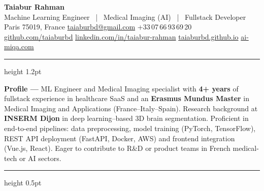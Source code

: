 \documentclass[10pt, a4paper]{article}
\begin{document}

\begin{center}
  {\fontsize{22pt}{26pt}\selectfont\bfseries\color{darktext} Taiabur Rahman}\\[4pt]
  {\normalsize\color{graytext}
    Machine Learning Engineer \ \textcolor{rulecol}{|} \ Medical Imaging (AI) \ \textcolor{rulecol}{|} \ Fullstack Developer}\\[6pt]
  \small\color{graytext}
  \faMapMarker*\enspace Paris 75019, France
  \enspace\textcolor{rulecol}{\textbar}\enspace
  \faEnvelope\enspace \href{mailto:taiaburbd@gmail.com}{taiaburbd@gmail.com}
  \enspace\textcolor{rulecol}{\textbar}\enspace
  \faPhone\enspace +33\,07\,66\,93\,69\,20
  \\[3pt]
  \faGithub\enspace \href{https://github.com/taiaburbd}{github.com/taiaburbd}
  \enspace\textcolor{rulecol}{\textbar}\enspace
  \faLinkedin\enspace \href{https://www.linkedin.com/in/taiabur-rahman}{linkedin.com/in/taiabur-rahman}
  \enspace\textcolor{rulecol}{\textbar}\enspace
  \faGlobe\enspace \href{https://taiaburbd.github.io}{taiaburbd.github.io}
  \enspace\textcolor{rulecol}{\textbar}\enspace
  \faDesktop\enspace \href{https://ai-miqa.com}{ai-miqa.com}
\end{center}

\vspace{3pt}
{\color{accent}\hrule height 1.2pt}
\vspace{6pt}

\textbf{\color{accent}Profile — }%
ML Engineer and Medical Imaging specialist with \textbf{4+ years} of fullstack
experience in healthcare SaaS and an \textbf{Erasmus Mundus Master} in Medical Imaging
and Applications (France–Italy–Spain). Research background at \textbf{INSERM Dijon}
in deep learning–based 3D brain segmentation. Proficient in end-to-end pipelines:
data preprocessing, model training (PyTorch, TensorFlow), REST API deployment
(FastAPI, Docker, AWS) and frontend integration (Vue.js, React).
Eager to contribute to R\&D or product teams in French medical-tech or AI sectors.

\vspace{5pt}
{\color{rulecol}\hrule height 0.5pt}
\vspace{4pt}
\end{document}
